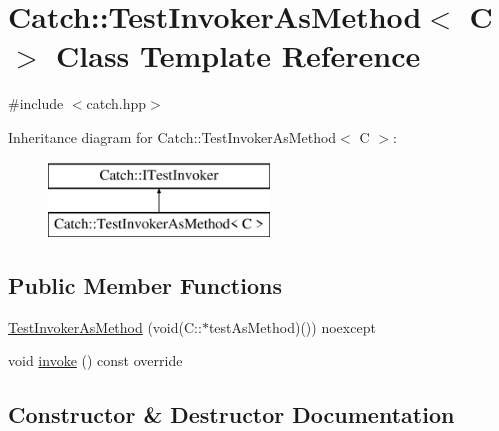 \hypertarget{classCatch_1_1TestInvokerAsMethod}{}\section{Catch\+:\+:Test\+Invoker\+As\+Method$<$ C $>$ Class Template Reference}
\label{classCatch_1_1TestInvokerAsMethod}


{\ttfamily \#include $<$catch.\+hpp$>$}

Inheritance diagram for Catch\+:\+:Test\+Invoker\+As\+Method$<$ C $>$\+:\begin{figure}[H]
\begin{center}
\leavevmode
\includegraphics[height=2.000000cm]{classCatch_1_1TestInvokerAsMethod}
\end{center}
\end{figure}
\subsection*{Public Member Functions}
\begin{DoxyCompactItemize}
\item 
\mbox{\hyperlink{classCatch_1_1TestInvokerAsMethod_a119c4bdbbdd95c42859c18541987a1a4}{Test\+Invoker\+As\+Method}} (void(C\+::$\ast$test\+As\+Method)()) noexcept
\item 
void \mbox{\hyperlink{classCatch_1_1TestInvokerAsMethod_a8115a06efe273f4112ec0b5452c1b5f2}{invoke}} () const override
\end{DoxyCompactItemize}


\subsection{Constructor \& Destructor Documentation}
\mbox{\label{classCatch_1_1TestInvokerAsMethod_a119c4bdbbdd95c42859c18541987a1a4}} 
